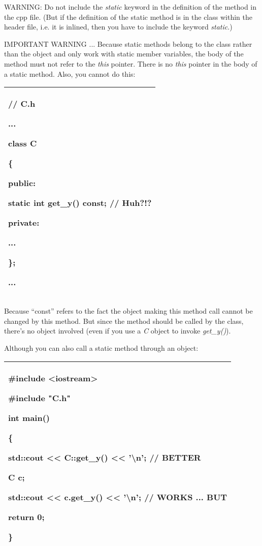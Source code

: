 \documentclass[
]{article}
\begin{document}
WARNING: Do not include the \emph{static} keyword in the definition of
the method in the cpp file. (But if the definition of the static method
is in the class within the header file, i.e. it is inlined, then you
have to include the keyword \emph{static}.)

IMPORTANT WARNING ... Because static methods belong to the class rather
than the object and only work with static member variables, the body of
the method must not refer to the \emph{this} pointer. There is no
\emph{this} pointer in the body of a static method. Also, you cannot do
this:

\begin{longtable}[]{@{}l@{}}
\toprule
\endhead
\begin{minipage}[t]{0.97\columnwidth}\raggedright
// C.h

...

class C

\{

public:

static int get\_y() const; // Huh?!?

private:

...

\};

...\strut
\end{minipage}\tabularnewline
\bottomrule
\end{longtable}

Because ``const'' refers to the fact the object making this method call
cannot be changed by this method. But since the method should be called
by the class, there's no object involved (even if you use a \emph{C}
object to invoke \emph{get\_y()}).

Although you can also call a static method through an object:

\begin{longtable}[]{@{}l@{}}
\toprule
\endhead
\begin{minipage}[t]{0.97\columnwidth}\raggedright
\#include \textless iostream\textgreater{}

\#include "C.h"

int main()

\{

std::cout \textless\textless{} C::get\_y() \textless\textless{}
'\textbackslash n'; // BETTER

C c;

std::cout \textless\textless{} c.get\_y() \textless\textless{}
'\textbackslash n'; // WORKS ... BUT

return 0;

\}\strut
\end{minipage}\tabularnewline
\bottomrule
\end{longtable}
\end{document}
